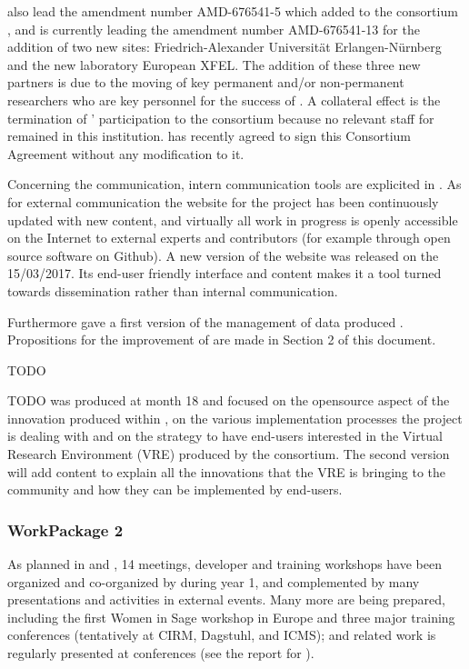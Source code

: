\documentclass{deliverablereport}
\begin{document}
 also lead the amendment number AMD-676541-5 which added to the consortium , and is currently leading the amendment number AMD-676541-13 for the addition of two new sites: Friedrich-Alexander Universität Erlangen-Nürnberg and the new laboratory European XFEL. The addition of these three new partners is due to the moving of key permanent and/or non-permanent researchers who are key personnel for the success of \ODK. A collateral effect is the termination of ' participation to the consortium because no relevant staff for \ODK remained in this institution.
 has recently agreed to sign this Consortium Agreement
without any modification to it.


Concerning the communication, intern communication tools are explicited in .
As for external communication the website for the project has been continuously
updated with new content, and virtually all work in progress is openly
accessible on the Internet to external experts and contributors (for
example through open source software on Github). A new version of the website was released on the 15/03/2017. Its end-user friendly interface and content makes it a tool turned towards dissemination rather than internal communication.

 
Furthermore  gave a first version of the management of data produced \ODK. Propositions for the improvement of are made in Section 2 of this document. 


TODO

TODO
 was produced at month 18 and focused on the opensource aspect of the innovation produced within \ODK, on the various implementation processes the project is dealing with and on the strategy to have end-users interested in the Virtual Research Environment (VRE) produced by the consortium. The second version will add content to explain all the innovations that the VRE is bringing to the community and how they can be implemented by end-users.


\subsubsection{WorkPackage 2}

As planned in  and
, 14 meetings, developer and
training workshops have been organized and co-organized by \ODK during
year 1, and complemented by many presentations and activities in
external events.  Many more are being prepared, including the first
Women in Sage workshop in Europe and three major training conferences
(tentatively at CIRM, Dagstuhl, and ICMS); \ODK and \ODK related work
is regularly presented at conferences (see the report for
).
\end{document}
